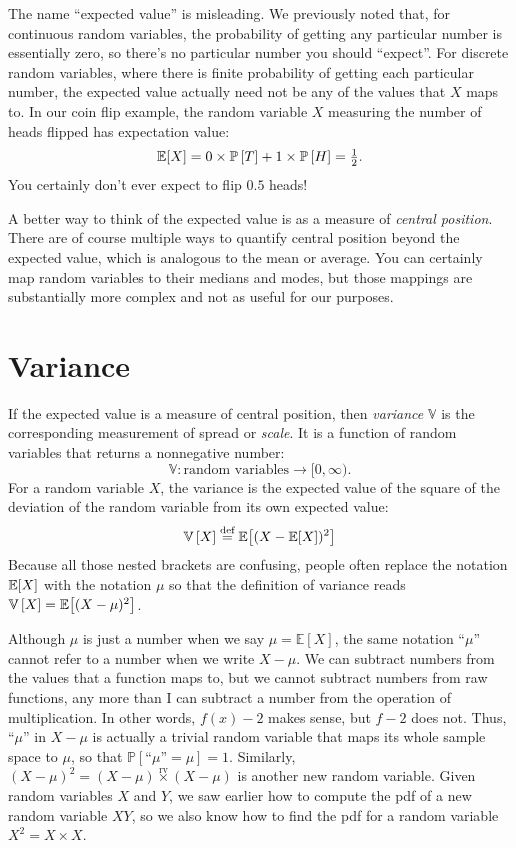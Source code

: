 The name ``expected value'' is misleading. We previously noted that,
for continuous random variables, the probability of getting any particular
number is essentially zero, so there's no particular number you should
``expect''. For discrete random variables, where there is finite probability
of getting each particular number, the expected value actually need not be any of the
values that $X$ maps to. In our coin flip example, the random variable
$X$ measuring the number of heads flipped has expectation value:
\begin{equation}
\mathbb{E}\!\left[{X}\right] = 0 \times \mathbb{P}\left[{T}\right] + 1 \times \mathbb{P}\left[{H}\right] = \tfrac{1}{2}.
\end{equation}
You certainly don't ever expect to flip $0.5$ heads!

A better way to think of the expected value is as a measure of \emph{central position}.
There are of course multiple ways to quantify central position beyond the
expected value, which is analogous to the mean or average. You can certainly
map random variables to their medians and modes, but those mappings are substantially
more complex and not as useful for our purposes.

\section{Variance}

If the expected value is a measure of central position, then \emph{variance} $\mathbb{V}$
is the corresponding measurement of spread or \emph{scale}. It is a function of random
variables that returns a nonnegative number:
\begin{equation*}
\mathbb{V} : \text{random variables} \to [0, \infty).
\end{equation*}
For a random variable $X$, the variance is the expected value of the square of
the deviation of the random variable from its own expected value:
\begin{equation*}
\mathbb{V}\left[{X}\right] \stackrel{\text{def}}{=} \mathbb{E}\!\left[{(X - \mathbb{E}\!\left[{X}\right])^2}\right]
\end{equation*}
Because all those nested brackets are confusing, people often replace the
notation $\mathbb{E}\!\left[{X}\right]$ with the notation $\mu$ so that the definition of
variance reads $\mathbb{V}\left[{X}\right] = \mathbb{E}\!\left[{(X - \mu)^2}\right]$.

Although $\mu$ is just a number when we say $\mu = \mathbb{E}[X]$, the same
notation ``$\mu$'' cannot refer to a number when we write $X - \mu$. We can
subtract numbers from the values that a function maps to, but we cannot subtract
numbers from raw functions, any more than I can subtract a number from the
operation of multiplication. In other words, $f(x) - 2$ makes sense, but $f - 2$
does not. Thus, ``$\mu$'' in $X - \mu$ is actually a trivial random variable that
maps its whole sample space to $\mu$, so that
$\mathbb{P}[\text{``}\mu\text{''} = \mu] = 1$.
Similarly, $(X - \mu)^2 = (X - \mu) \stackrel{\mathrm{rv}}{\times} (X - \mu)$
is another new random variable. Given random variables $X$ and $Y$, we saw
earlier how to compute the pdf of a new random variable $XY$, so we also know how to
find the pdf for a random variable $X^2 = X \times X$.


